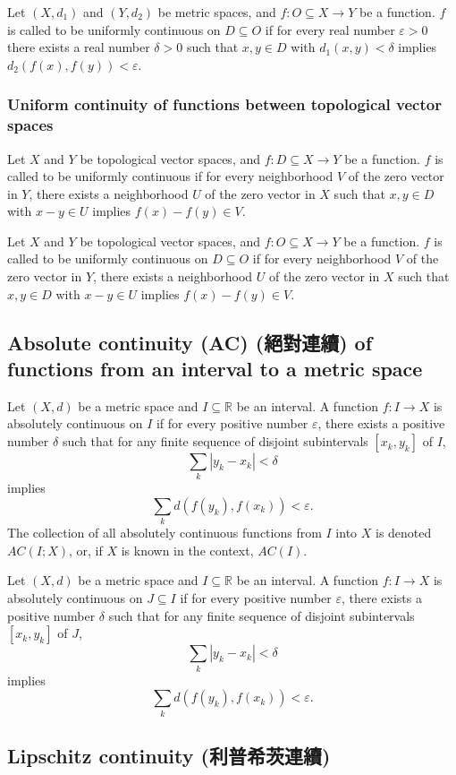 \begin{itemize}
\begin{itemize}
Let $(X,d_1)$ and $(Y,d_2)$ be metric spaces, and $f\colon O\subseteq X\to Y$ be a function. $f$ is called to be uniformly continuous on $D\subseteq O$ if for every real number $\varepsilon >0$ there exists a real number $\delta >0$ such that $x,y\in D$ with $d_{1}(x,y)<\delta$ implies $d_{2}(f(x),f(y))<\varepsilon$.
\subsubsection{Uniform continuity of functions between topological vector spaces}
Let $X$ and $Y$ be topological vector spaces, and $f\colon D\subseteq X\to Y$ be a function. $f$ is called to be uniformly continuous if for every neighborhood $V$ of the zero vector in $Y$, there exists a neighborhood $U$ of the zero vector in $X$ such that $x,y\in D$ with $x-y\in U$ implies $f(x)-f(y)\in V$.

Let $X$ and $Y$ be topological vector spaces, and $f\colon O\subseteq X\to Y$ be a function. $f$ is called to be uniformly continuous on $D\subseteq O$ if for every neighborhood $V$ of the zero vector in $Y$, there exists a neighborhood $U$ of the zero vector in $X$ such that $x,y\in D$ with $x-y\in U$ implies $f(x)-f(y)\in V$.
\subsection{Absolute continuity (AC) (絕對連續) of functions from an interval to a metric space}
Let $(X, d)$ be a metric space and $I\subseteq\mathbb{R}$ be an interval. A function $f\colon I \to X$ is absolutely continuous on $I$ if for every positive number $\varepsilon$, there exists a positive number $\delta$ such that for any finite sequence of disjoint subintervals $[x_k, y_k]$ of $I$,
\[\sum _{k}\left|y_{k}-x_{k}\right|<\delta\]
implies
\[\sum _{k}d\left(f(y_{k}),f(x_{k})\right)<\varepsilon.\]
The collection of all absolutely continuous functions from $I$ into $X$ is denoted $AC(I; X)$, or, if $X$ is known in the context, $AC(I)$.

Let $(X, d)$ be a metric space and $I\subseteq\mathbb{R}$ be an interval. A function $f\colon I \to X$ is absolutely continuous on $J\subseteq I$ if for every positive number $\varepsilon$, there exists a positive number $\delta$ such that for any finite sequence of disjoint subintervals $[x_k, y_k]$ of $J$,
\[\sum _{k}\left|y_{k}-x_{k}\right|<\delta\]
implies
\[\sum _{k}d\left(f(y_{k}),f(x_{k})\right)<\varepsilon.\]
\subsection{Lipschitz continuity (利普希茨連續)}

\end{itemize}
\end{itemize}
